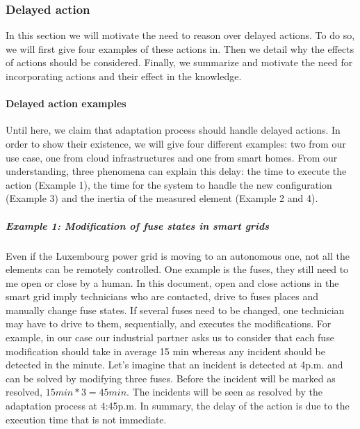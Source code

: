 \subsubsection{Delayed action}

In this section we will motivate the need to reason over delayed actions.
To do so, we will first give four examples of these actions in.
Then we detail why the effects of actions should be considered.
Finally, we summarize and motivate the need for incorporating actions and their effect in the knowledge. 

\paragraph{Delayed action examples}
Until here, we claim that adaptation process should handle delayed actions.
In order to show their existence, we will give four different examples: two from our use case, one from cloud infrastructures and one from smart homes.
From our understanding, three phenomena can explain this delay: the time to execute the action (\cf Example 1), the time for the system to handle the new configuration (\cf Example 3) and the inertia of the measured element (\cf Example 2 and 4).

\subparagraph{Example 1: Modification of fuse states in smart grids}
Even if the Luxembourg power grid is moving to an autonomous one, not all the elements can be remotely controlled.
One example is the fuses, they still need to me open or close by a human.
In this document, open and close actions in the smart grid imply technicians who are contacted, drive to fuses places and manually change fuse states.
If several fuses need to be changed, one technician may have to drive to them, sequentially, and executes the modifications.
For example, in our case our industrial partner asks us to consider that each fuse modification should take in average 15 min whereas any incident should be detected in the minute.
Let's imagine that an incident is detected at 4p.m. and can be solved by modifying three fuses.
Before the incident will be marked as resolved, $15min * 3 = 45min$. 
The incidents will be seen as resolved by the adaptation process at 4:45p.m.
In summary, the delay of the action is due to the execution time that is not immediate.

